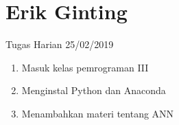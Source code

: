 \chapter{Erik Ginting}

Tugas Harian 25/02/2019
\begin{enumerate}
  \item Masuk kelas pemrograman III
  \item Menginstal Python dan Anaconda
  \item Menambahkan materi tentang ANN
\end{enumerate}


